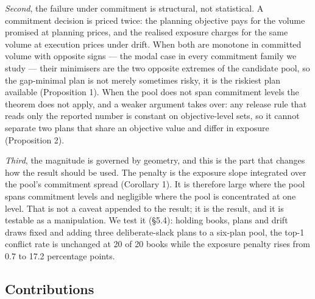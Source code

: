 \documentclass[preprint,12pt,letterpaper]{elsarticle}
\theoremstyle{definition}
\theoremstyle{plain}
\begin{document}
\textit{Second}, the failure under commitment is structural, not statistical. A commitment decision is priced twice: the planning objective pays for the volume promised at planning prices, and the realised exposure charges for the same volume at execution prices under drift. When both are monotone in committed volume with opposite signs --- the modal case in every commitment family we study --- their minimisers are the two opposite extremes of the candidate pool, so the gap-minimal plan is not merely sometimes risky, it is the riskiest plan available (Proposition 1). When the pool does not span commitment levels the theorem does not apply, and a weaker argument takes over: any release rule that reads only the reported number is constant on objective-level sets, so it cannot separate two plans that share an objective value and differ in exposure (Proposition 2).

\textit{Third}, the magnitude is governed by geometry, and this is the part that changes how the result should be used. The penalty is the exposure slope integrated over the pool's commitment spread (Corollary 1). It is therefore large where the pool spans commitment levels and negligible where the pool is concentrated at one level. That is not a caveat appended to the result; it is the result, and it is testable as a manipulation. We test it (\S 5.4): holding books, plans and drift draws fixed and adding three deliberate-slack plans to a six-plan pool, the top-1 conflict rate is unchanged at 20 of 20 books while the exposure penalty rises from 0.7 to 17.2 percentage points.

\subsection{Contributions}
\end{document}
